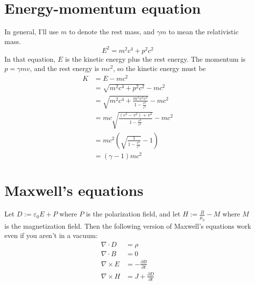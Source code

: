 \documentclass[12pt]{article}
\begin{document}
\section{Energy-momentum equation}
In general, I'll use $m$ to denote the rest mass, and $\gamma m$ to mean the relativistic mass.
\[E^2 = m^2 c^4 + p^2 c^2\]
In that equation, $E$ is the kinetic energy plus the rest energy. The momentum is $p = \gamma m v$, and the rest energy is $mc^2$, so the kinetic energy must be
\begin{align*}
    K &= E - mc^2 \\
      &= \sqrt{m^2 c^4 + p^2 c^2} - mc^2 \\
      &= \sqrt{m^2 c^4 + \frac{m^2 v^2 c^2}{1 - \frac{v^2}{c^2}}} - mc^2 \\
      &= m c \sqrt{\frac{(c^2 - v^2) + v^2}{1 - \frac{v^2}{c^2}}} - mc^2 \\
      &= m c^2 \left( \sqrt{\frac{1}{1 - \frac{v^2}{c^2}}} - 1 \right) \\
      &= (\gamma - 1) m c^2
\end{align*}

\section{Maxwell's equations}
Let $D := \varepsilon_0 E + P$ where $P$ is the polarization field, and let $H := \frac{B}{\mu_0} - M$ where $M$ is the magnetization field. Then the following version of Maxwell's equations work even if you aren't in a vacuum:
\begin{align*}
    \nabla \cdot D &= \rho \\
    \nabla \cdot B &= 0 \\
    \nabla \times E &= - \frac{\partial B}{\partial t} \\
    \nabla \times H &= J + \frac{\partial D}{\partial t}
\end{align*}
\end{document}
